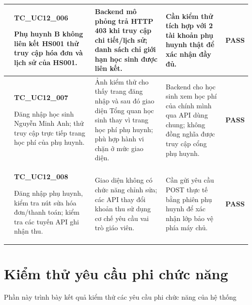 \begin{longtable}{|>{\centering\arraybackslash}p{0.8cm}|>{\raggedright\arraybackslash}p{4.6cm}|>{\raggedright\arraybackslash}p{3.8cm}|>{\raggedright\arraybackslash}p{3.8cm}|>{\centering\arraybackslash}p{1.5cm}|}
6 & \textbf{TC\_UC12\_006}\par Phụ huynh B không liên kết HS001 thử truy cập hóa đơn và lịch sử của HS001. & Backend mô phỏng trả HTTP 403 khi truy cập chi tiết/lịch sử; danh sách chỉ giới hạn học sinh được liên kết. & Cần kiểm thử tích hợp với 2 tài khoản phụ huynh thật để xác nhận đầy đủ. & \textbf{PASS} \\ \hline
7 & \textbf{TC\_UC12\_007}\par Đăng nhập học sinh Nguyễn Minh Anh; thử truy cập trực tiếp trang học phí của phụ huynh. & Ảnh kiểm thử cho thấy trang đăng nhập và sau đó giao diện Tổng quan học sinh thay vì trang học phí phụ huynh; phù hợp hành vi chặn ở mức giao diện. & Backend cho học sinh xem học phí của chính mình qua API dùng chung; không đồng nghĩa được truy cập cổng phụ huynh. & \textbf{PASS} \\ \hline
8 & \textbf{TC\_UC12\_008}\par Đăng nhập phụ huynh, kiểm tra nút sửa hóa đơn/thanh toán; kiểm tra các tuyến API ghi nhận thu. & Giao diện không có chức năng chỉnh sửa; các API thay đổi khoản thu sử dụng cơ chế yêu cầu vai trò giáo viên. & Cần gửi yêu cầu POST thực tế bằng phiên phụ huynh để xác nhận lớp bảo vệ phía máy chủ. & \textbf{PASS} \\ \hline
\end{longtable}

\section{Kiểm thử yêu cầu phi chức năng}

Phần này trình bày kết quả kiểm thử các yêu cầu phi chức năng của hệ thống

